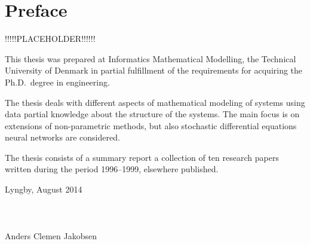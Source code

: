 \chapter{Preface}

!!!!!PLACEHOLDER!!!!!!

This thesis was prepared at Informatics Mathematical Modelling,
the Technical University of Denmark in partial fulfillment of the
requirements for acquiring the Ph.D.\ degree in engineering.

The thesis deals with different aspects of mathematical modeling of
systems using data partial knowledge about the structure of the
systems.  The main focus is on extensions of non-parametric methods,
but also stochastic differential equations neural networks are
considered.

The thesis consists of a summary report a collection of ten
research papers written during the period 1996--1999, elsewhere
published.

\vspace{20mm}
\mbox{}\hfill
\begin{minipage}[t]{80mm}
  Lyngby, August 2014
  \\ \\ \\ \\
Anders Clemen Jakobsen
\end{minipage}
